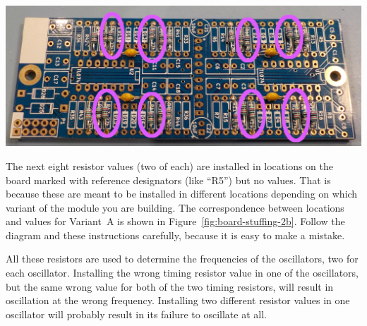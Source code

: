 \noindent\includegraphics[width=\linewidth]{res-27k.jpg}

The next eight resistor values (two of each) are installed in locations on
the board marked with reference designators (like ``R5'') but no values. 
That is because these are meant to be installed in different locations
depending on which variant of the module you are building.  The
correspondence between locations and values for Variant~A is shown in
Figure~\ref{fig:board-stuffing-2b}.  Follow the diagram and these
instructions carefully, because it is easy to make a mistake.

All these resistors are used to determine the frequencies of the
oscillators, two for each oscillator.  Installing the wrong timing resistor
value in one of the oscillators, but the same wrong value for both of the
two timing resistors, will result in oscillation at the wrong frequency. 
Installing two different resistor values in one oscillator will probably
result in its failure to oscillate at all.

\def\RVA{100k$\Omega$}\def\CVA{0.22$\mu$F}\def\TVA{140ms}\def\FVA{7.2Hz}
\def\RVB{390k$\Omega$}\def\CVB{0.10$\mu$F}\def\TVB{240ms}\def\FVB{4.1Hz}
\def\RVC{150k$\Omega$}\def\CVC{0.47$\mu$F}\def\TVC{440ms}\def\FVC{2.2Hz}
\def\RVD{1.8M$\Omega$}\def\CVD{0.10$\mu$F}\def\TVD{1.1s}\def\FVD{880mHz}
\def\RVE{1.0M$\Omega$}\def\CVE{0.47$\mu$F}\def\TVE{3.0s}\def\FVE{340mHz}
\def\RVF{1.2M$\Omega$}\def\CVF{1.0$\mu$F}\def\TVF{7.5s}\def\FVF{130mHz}
\def\RVG{10M$\Omega$}\def\CVG{0.22$\mu$F}\def\TVG{14s}\def\FVG{72mHz}
\def\RVH{5.6M$\Omega$}\def\CVH{1.0$\mu$F}\def\TVH{35s}\def\FVH{28mHz}

